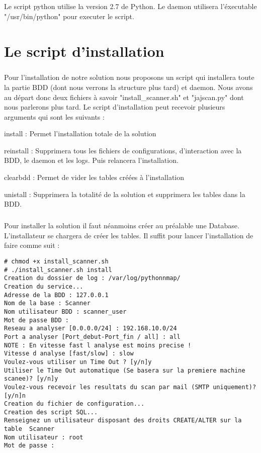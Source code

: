 \documentclass[12pt]{report}
\begin{document}
		\paragraph{}
			Le script python utilise la version 2.7 de Python. Le daemon utilisera l'éxecutable "/usr/bin/python" pour executer le script.
	\chapter{Le script d'installation}
		\paragraph{}
			Pour l'installation de notre solution nous proposons un script qui installera toute la partie BDD (dont nous verrons la structure plus tard) et daemon. Nous avons au départ donc deux fichiers à savoir "install\_scanner.sh" et "jajscan.py" dont nous parlerons plus tard. Le script d'installation peut recevoir plusieurs arguments qui sont les suivants :
			\begin{description}
				\item install : Permet l'installation totale de la solution
				\item reinstall : Supprimera tous les fichiers de configurations, d'interaction avec la BDD, le daemon et les logs. Puis relancera l'installation.
				\item clearbdd : Permet de vider les tables créées à l'installation
				\item unistall : Supprimera la totalité de la solution et supprimera les tables dans la BDD.
			\end{description}
		\paragraph{}
			Pour installer la solution il faut néanmoins créer au préalable une Database. L'installateur se chargera de créer les tables. Il suffit pour lancer l'installation de faire comme suit :
			\begin{lstlisting}[caption=Installation, captionpos=b]
# chmod +x install_scanner.sh 
# ./install_scanner.sh install
Creation du dossier de log : /var/log/pythonnmap/
Creation du service...
Adresse de la BDD : 127.0.0.1
Nom de la base : Scanner
Nom utilisateur BDD : scanner_user
Mot de passe BDD : 
Reseau a analyser [0.0.0.0/24] : 192.168.10.0/24
Port a analyser [Port_debut-Port_fin / all] : all
NOTE : En vitesse fast l analyse est moins precise !
Vitesse d analyse [fast/slow] : slow
Voulez-vous utiliser un Time Out ? [y/n]y
Utiliser le Time Out automatique (Se basera sur la premiere machine scanee)? [y/n]y
Voulez-vous recevoir les resultats du scan par mail (SMTP uniquement)? [y/n]n
Creation du fichier de configuration...
Creation des script SQL...
Renseignez un utilisateur disposant des droits CREATE/ALTER sur la table  Scanner
Nom utilisateur : root
Mot de passe :
			\end{lstlisting}
\end{document}
